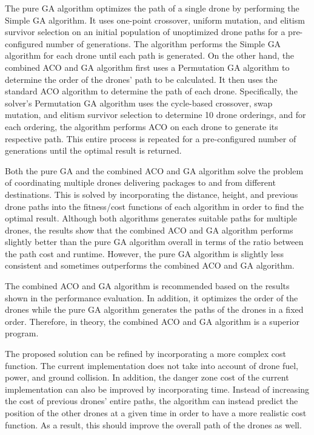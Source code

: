 \documentclass[conference]{IEEEtran}
\begin{document}
The pure GA algorithm optimizes the path of a single drone by performing the Simple GA algorithm. It uses one-point crossover, uniform mutation, and elitism survivor selection on an initial population of unoptimized drone paths for a pre-configured number of generations. The algorithm performs the Simple GA algorithm for each drone until each path is generated. On the other hand, the combined ACO and GA algorithm first uses a Permutation GA algorithm to determine the order of the drones' path to be calculated. It then uses the standard ACO algorithm to determine the path of each drone. Specifically, the solver's Permutation GA algorithm uses the cycle-based crossover, swap mutation, and elitism survivor selection to determine 10 drone orderings, and for each ordering, the algorithm performs ACO on each drone to generate its respective path. This entire process is repeated for a pre-configured number of generations until the optimal result is returned.

Both the pure GA and the combined ACO and GA algorithm solve the problem of coordinating multiple drones delivering packages to and from different destinations. This is solved by incorporating the distance, height, and previous drone paths into the fitness/cost functions of each algorithm in order to find the optimal result. Although both algorithms generates suitable paths for multiple drones, the results show that the combined ACO and GA algorithm performs slightly better than the pure GA algorithm overall in terms of the ratio between the path cost and runtime. However, the pure GA algorithm is slightly less consistent and sometimes outperforms the combined ACO and GA algorithm.

The combined ACO and GA algorithm is recommended based on the results shown in the performance evaluation. In addition, it optimizes the order of the drones while the pure GA algorithm generates the paths of the drones in a fixed order. Therefore, in theory, the combined ACO and GA algorithm is a superior program.

The proposed solution can be refined by incorporating a more complex cost function. The current implementation does not take into account of drone fuel, power, and ground collision. In addition, the danger zone cost of the current implementation can also be improved by incorporating time. Instead of increasing the cost of previous drones' entire paths, the algorithm can instead predict the position of the other drones at a given time in order to have a more realistic cost function. As a result, this should improve the overall path of the drones as well.
\end{document}
